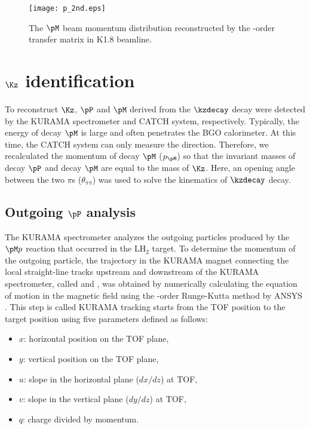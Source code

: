\begin{figure}[!h]
  \begin{center}
    \texttt{[image: p\_2nd.eps]}
    \caption{The $\pM$ beam momentum distribution reconstructed by the -order transfer matrix in K1.8 beamline.}
    \label{fig-p_2nd}
  \end{center}
\end{figure}


\clearpage
\section{$\Kz$ identification}
\label{sec-kzreco}
To reconstruct $\Kz$, $\pP$ and $\pM$ derived from the $\kzdecay$ decay were detected by the KURAMA spectrometer and CATCH system, respectively. Typically, the energy of decay $\pM$ is large and often penetrates the BGO calorimeter. At this time, the CATCH system can only measure the direction. Therefore, we recalculated the momentum of decay $\pM$ ($p_{\pM}$) so that the invariant masses of decay $\pP$ and decay $\pM$ are equal to the mass of $\Kz$. Here, an opening angle between the two $\pi$s ($\theta_{\pi\pi}$) was used to solve the kinematics of $\kzdecay$ decay.

\subsection{Outgoing $\pP$ analysis}
The KURAMA spectrometer analyzes the outgoing particles produced by the $\pM p$ reaction that occurred in the LH$_2$ target. To determine the momentum of the outgoing particle, the trajectory in the KURAMA magnet connecting the local straight-line tracks upstream and downstream of the KURAMA spectrometer, called  and , was obtained by numerically calculating the equation of motion in the magnetic field using the -order Runge-Kutta method by ANSYS \cite{Runge}. This step is called  KURAMA tracking starts from the TOF position to the target position using five parameters defined as follows:
\begin{itemize}
  \item $x$: horizontal position on the TOF plane,
  \item $y$: vertical position on the TOF plane,
  \item $u$: slope in the horizontal plane ($dx/dz$) at TOF,
  \item $v$: slope in the vertical plane ($dy/dz$) at TOF,
  \item $q$: charge divided by momentum.
\end{itemize}

